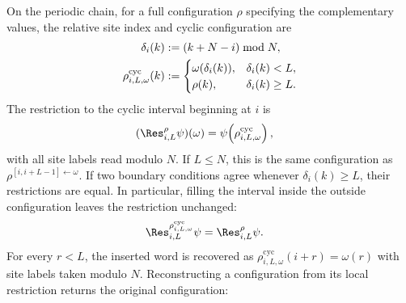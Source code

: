 \begin{remark}\label{rem:cyclic_window_operators}
    \leanok
    On the periodic chain, for a full configuration $\rho$ specifying the
    complementary values, the relative site index and cyclic configuration are
    \begin{align}
        \delta_i(k)
         & := (k+N-i)\bmod N,
        \notag                \\
        \rho^{\mathrm{cyc}}_{i,L,\omega}(k)
         & :=
        \begin{cases}
            \omega(\delta_i(k)), & \delta_i(k)<L,    \\
            \rho(k),             & \delta_i(k)\ge L.
        \end{cases}
        \notag
    \end{align}
    The restriction to the cyclic interval beginning at $i$ is
    \begin{align}
        (\Res^\rho_{i,L}\psi)(\omega)
         & = \psi\!\left(\rho^{\mathrm{cyc}}_{i,L,\omega}\right),
        \notag
    \end{align}
    with all site labels read modulo $N$. If $L\le N$, this is the same
    configuration as $\rho^{[i,i+L-1]\leftarrow\omega}$. If two boundary
    conditions agree whenever $\delta_i(k)\ge L$, their restrictions are equal.
    In particular, filling the interval inside the outside configuration leaves
    the restriction unchanged:
    \begin{align}
        \Res^{\rho^{\mathrm{cyc}}_{i,L,\omega}}_{i,L}\psi
         & = \Res^\rho_{i,L}\psi.
        \notag
    \end{align}
    For every $r<L$, the inserted word is recovered as
    $\rho^{\mathrm{cyc}}_{i,L,\omega}(i+r)=\omega(r)$ with site labels taken modulo $N$.
    Reconstructing a configuration from its local restriction returns the original configuration:

\end{remark}
